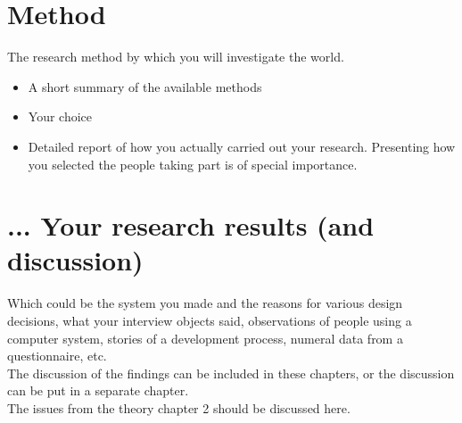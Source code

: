   \section{Method}
    The research method by which you will investigate the world.
    \begin{itemize} 
      \item A short summary of the available methods
      \item Your choice
      \item Detailed report of how you actually carried out your research. Presenting how you selected 
        the people taking part is of special importance.
    \end{itemize}
  
  \section{... Your research results (and discussion)}
    Which could be the system you made and the reasons for various design decisions, what your 
      interview objects said, observations of people using a computer system, stories of a development 
      process, numeral data from a questionnaire, etc. \\
    The discussion of the findings can be included in these chapters, or the discussion can be put in 
      a separate chapter.  \\
    The issues from the theory chapter 2 should be discussed here.

